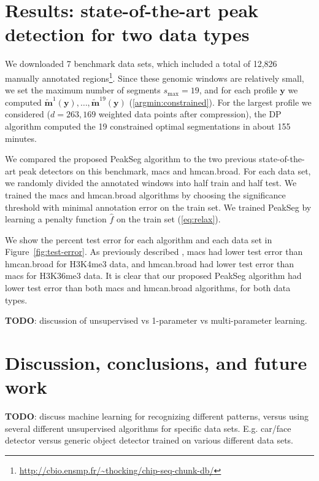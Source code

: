 \documentclass{article}
\begin{document}
\section{Results: state-of-the-art peak detection for two data types}

We downloaded 7 benchmark data sets, which included a
total of 12,826 manually annotated regions\footnote{\url{http://cbio.ensmp.fr/~thocking/chip-seq-chunk-db/}}.
Since these genomic windows are relatively small, we set the maximum
number of segments $s_{\text{max}}=19$, and for each profile $\mathbf
y$ we computed $\mathbf{\tilde m}^1(\mathbf y), \dots, \mathbf{\tilde
  m}^{19}(\mathbf y)$ (\ref{argmin:constrained}). For the largest
profile we considered ($d=263,169$ weighted data points after
compression), the DP algorithm computed the 19 constrained optimal
segmentations in about 155 minutes.

We compared the proposed PeakSeg algorithm to the two previous
state-of-the-art peak detectors on this benchmark, macs and
\mbox{hmcan.broad}. For each data set, we randomly divided the
annotated windows into half train and half test. We trained the macs
and hmcan.broad algorithms by choosing the significance threshold with
minimal annotation error on the train set. We trained PeakSeg by
learning a penalty function $\hat f$ on the train set
(\ref{eq:relax}).

We show the percent test error for each algorithm and each data set in
Figure~\ref{fig:test-error}. As previously described
\citep{hocking2014visual}, macs had lower test error than
\mbox{hmcan.broad} for H3K4me3 data, and \mbox{hmcan.broad} had lower
test error than macs for H3K36me3 data. It is clear that our proposed
PeakSeg algorithm had lower test error than both macs and hmcan.broad
algorithms, for both data types.

\textbf{TODO}: discussion of unsupervised vs 1-parameter vs multi-parameter
learning.

%   

\section{Discussion, conclusions, and future work}

\textbf{TODO}: discuss machine learning for recognizing different
patterns, versus using several different unsupervised algorithms for
specific data sets. E.g. car/face detector versus generic object
detector trained on various different data sets.
\end{document}
